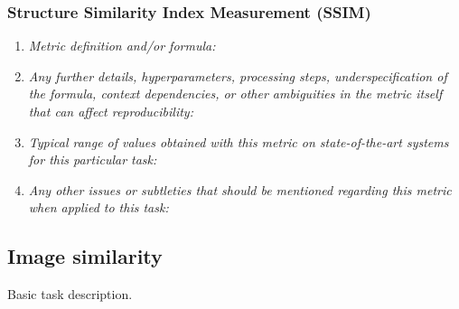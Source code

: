 \documentclass[a4paper,11pt]{article}
\begin{document}
        \subsubsection{Structure Similarity Index Measurement (SSIM)}
            \begin{enumerate}[label=\alph*.]
                \item \textit{Metric definition and/or formula:}
                \bigskip
                \item \textit{Any further details, hyperparameters, processing steps, underspecification of the formula, context dependencies, or other ambiguities in the metric itself that can affect reproducibility:}
                \bigskip
                \item \textit{Typical range of values obtained with this metric on state-of-the-art systems for this particular task:}
                \bigskip
                \item \textit{Any other issues or subtleties that should be mentioned regarding this metric when applied to this task:}
                \bigskip
            \end{enumerate}

    \subsection{Image similarity}
        Basic task description.
\end{document}
